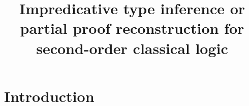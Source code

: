 \documentclass{amsart}
\title
[Impredicative type inference]
{
Impredicative type inference
\break
or
\break
partial proof reconstruction \break
for second-order classical logic
}
\begin{document}
\newcommand{\nc}{\newcommand}
\newcommand{\DotExpr}[2]{#1 #2.\ }
\nc\Abs    {\DotExpr\lambda}
\nc\All    {\DotExpr\forall}
\nc\Allin  {\forall\mathrm{in}}
\nc\Allex  {\forall\mathrm{ex}}
\nc\Abort  {\mathrm{abort}}
\nc\AbortCC{\mathrm{abort/cc}}
\nc\ApplyCC{\mathrm{apply/cc}}
\nc\Brouwer{\operatorname{Brouwer}}
\nc\Case   {}
\nc\Cps    {\operatorname{cps}}
\nc\Dn[1]  {(#1 \R \bot) \R \bot}
\nc\Dni    {\mathrm{\neg\neg I}}
\nc\Erase  {\mathrm{erase}}
\nc\Ex     {\DotExpr\exists}
\nc\Exin   {\exists\mathrm{in}}
\nc\Exex   {\exists\mathrm{ex}}
\nc\Exmid  {\text{excluded-middle}}
\nc\FV     {\operatorname{FV}}
\nc\Id     {\mathit{id}}
\nc\Indent {\hspace{3em}}
\nc\Mgsr   {\operatorname{mgsr}}
\nc\Or     {\ | \ }
\nc\Pack   {\mathrm{pack}}
\nc\Prune  {\operatorname{prune}}
\nc\Recall {\DotExpr\Xi} %
\nc\Redo   {\operatorname{redo}}
\nc\Tabs   {\DotExpr\Lambda}
\nc\Tech   {\text{technical}}
\nc\R      {\rightarrow}
\nc\Unpack {\mathrm{unpack}}
\nc\Undo   {\operatorname{undo}}
\nc\Unify  {\operatorname{unify}}
\maketitle
\tableofcontents

\section{Introduction}
\end{document}
